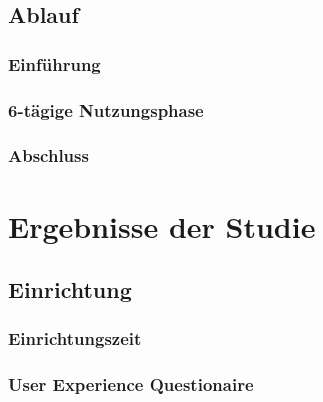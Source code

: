 \documentclass[doktyp=marbeit, twoside]{TUBAFarbeiten}
\begin{document}
    \subsection{Ablauf}
        \label{sec: studie prozedur}
        

        \subsubsection{Einführung}
            \label{sec: studie prozedur einfuerung}
            

        \subsubsection{6-tägige Nutzungsphase}
            \label{sec: studie prozedur phase}
            

        \subsubsection{Abschluss}
            \label{sec: studie prozedur abschluss}
            
        
\newpage
\section{Ergebnisse der Studie}
    \label{sec: ergebnisse studie}
    

    \subsection{Einrichtung}
        \label{sec: ergebnisse studie einrichtung}
        

        \subsubsection{Einrichtungszeit}
            \label{sec: ergebnisse studie einrichtungszeit}
            

        \subsubsection{User Experience Questionaire}
            \label{sec: ergebnisse studie ueq}
            
        
\end{document}
